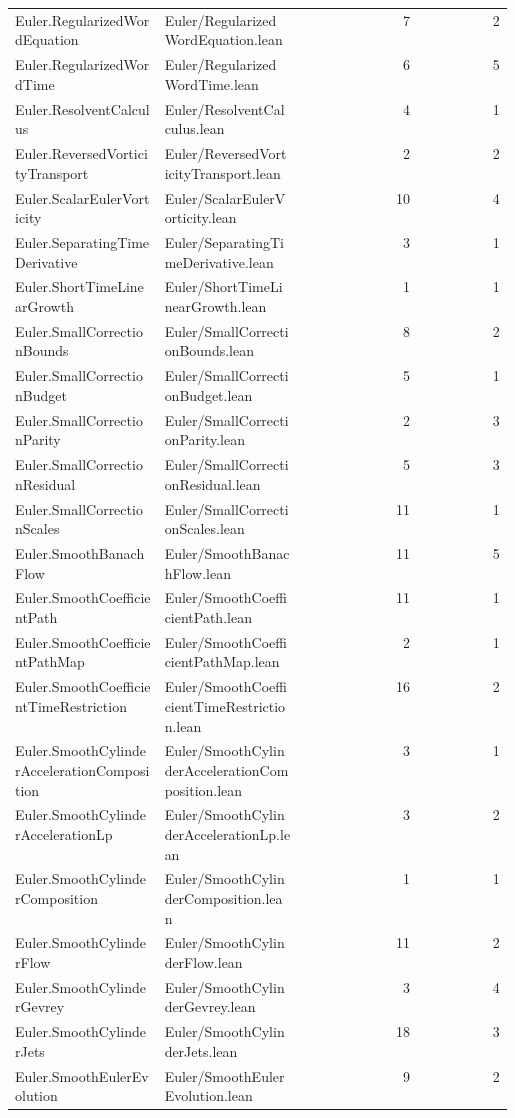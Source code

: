 \begin{longtable}{p{0.30\linewidth}p{0.28\linewidth}rr}
Euler.RegularizedWordEquation & Euler/RegularizedWordEquation.lean & 7 & 2\\
Euler.RegularizedWordTime & Euler/RegularizedWordTime.lean & 6 & 5\\
Euler.ResolventCalculus & Euler/ResolventCalculus.lean & 4 & 1\\
Euler.ReversedVorticityTransport & Euler/ReversedVorticityTransport.lean & 2 & 2\\
Euler.ScalarEulerVorticity & Euler/ScalarEulerVorticity.lean & 10 & 4\\
Euler.SeparatingTimeDerivative & Euler/SeparatingTimeDerivative.lean & 3 & 1\\
Euler.ShortTimeLinearGrowth & Euler/ShortTimeLinearGrowth.lean & 1 & 1\\
Euler.SmallCorrectionBounds & Euler/SmallCorrectionBounds.lean & 8 & 2\\
Euler.SmallCorrectionBudget & Euler/SmallCorrectionBudget.lean & 5 & 1\\
Euler.SmallCorrectionParity & Euler/SmallCorrectionParity.lean & 2 & 3\\
Euler.SmallCorrectionResidual & Euler/SmallCorrectionResidual.lean & 5 & 3\\
Euler.SmallCorrectionScales & Euler/SmallCorrectionScales.lean & 11 & 1\\
Euler.SmoothBanachFlow & Euler/SmoothBanachFlow.lean & 11 & 5\\
Euler.SmoothCoefficientPath & Euler/SmoothCoefficientPath.lean & 11 & 1\\
Euler.SmoothCoefficientPathMap & Euler/SmoothCoefficientPathMap.lean & 2 & 1\\
Euler.SmoothCoefficientTimeRestriction & Euler/SmoothCoefficientTimeRestriction.lean & 16 & 2\\
Euler.SmoothCylinderAccelerationComposition & Euler/SmoothCylinderAccelerationComposition.lean & 3 & 1\\
Euler.SmoothCylinderAccelerationLp & Euler/SmoothCylinderAccelerationLp.lean & 3 & 2\\
Euler.SmoothCylinderComposition & Euler/SmoothCylinderComposition.lean & 1 & 1\\
Euler.SmoothCylinderFlow & Euler/SmoothCylinderFlow.lean & 11 & 2\\
Euler.SmoothCylinderGevrey & Euler/SmoothCylinderGevrey.lean & 3 & 4\\
Euler.SmoothCylinderJets & Euler/SmoothCylinderJets.lean & 18 & 3\\
Euler.SmoothEulerEvolution & Euler/SmoothEulerEvolution.lean & 9 & 2\\

\end{longtable}
